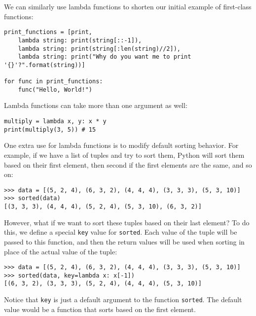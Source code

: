 \documentclass[11pt]{cselabheader}
\begin{document}
We can similarly use lambda functions to shorten our initial example of
first-class functions:

\begin{lstlisting}[style=python]
print_functions = [print,
    lambda string: print(string[::-1]),
    lambda string: print(string[:len(string)//2]),
    lambda string: print("Why do you want me to print '{}'?".format(string))]

for func in print_functions:
    func("Hello, World!")
\end{lstlisting}

Lambda functions can take more than one argument as well:
\begin{lstlisting}
multiply = lambda x, y: x * y
print(multiply(3, 5)) # 15
\end{lstlisting}

One extra use for lambda functions is to modify default sorting behavior. For
example, if we have a list of tuples and try to sort them, Python will sort them
based on their first element, then second if the first elements are the same,
and so on:

\begin{lstlisting}[style=ipython]
>>> data = [(5, 2, 4), (6, 3, 2), (4, 4, 4), (3, 3, 3), (5, 3, 10)]
>>> sorted(data)
[(3, 3, 3), (4, 4, 4), (5, 2, 4), (5, 3, 10), (6, 3, 2)]
\end{lstlisting}

However, what if we want to sort these tuples based on their last element? To do
this, we define a special \lstinline{key} value for \lstinline{sorted}. Each
value of the tuple will be passed to this function, and then the return values
will be used when sorting in place of the actual value of the tuple:

\begin{lstlisting}[style=ipython]
>>> data = [(5, 2, 4), (6, 3, 2), (4, 4, 4), (3, 3, 3), (5, 3, 10)]
>>> sorted(data, key=lambda x: x[-1])
[(6, 3, 2), (3, 3, 3), (5, 2, 4), (4, 4, 4), (5, 3, 10)]
\end{lstlisting}

Notice that \lstinline!key! is just a default argument to the function 
\lstinline!sorted!. The default value would be a function that sorts based on
the first element.
\end{document}
